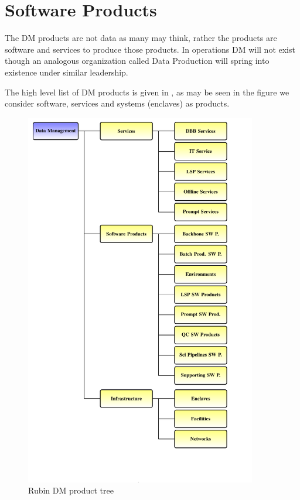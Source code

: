 \section {Software Products} \label{sec:softproducts}
The DM products are not data as many may think, rather the products are software and services to produce those
products.
In operations DM will not exist though an analogous organization called Data Production will spring into existence under similar leadership.


The high level list of DM products is given in , as may be seen in the  figure we consider software, services and systems (enclaves) as products.


\begin{figure}
\begin{centering}
\includegraphics[width=0.9\textwidth]{images/ProductTree}
	\caption{Rubin DM product tree \label{fig:pt}}
\end{centering}
\end{figure}



